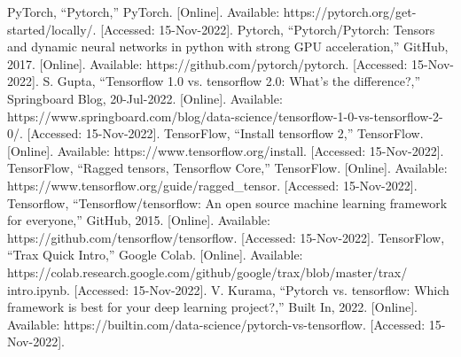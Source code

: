 \documentclass[conference]{IEEEtran}
\begin{document}
\begin{thebibliography}{00}
PyTorch, “Pytorch,” PyTorch. [Online]. Available: https://pytorch.org/get-started/locally/. [Accessed: 15-Nov-2022]. 
Pytorch, “Pytorch/Pytorch: Tensors and dynamic neural networks in python with strong GPU acceleration,” GitHub, 2017. [Online]. Available: https://github.com/pytorch/pytorch. [Accessed: 15-Nov-2022]. 
S. Gupta, “Tensorflow 1.0 vs. tensorflow 2.0: What's the difference?,” Springboard Blog, 20-Jul-2022. [Online]. Available: https://www.springboard.com/blog/data-science/tensorflow-1-0-vs-tensorflow-2-0/. [Accessed: 15-Nov-2022]. 
TensorFlow, “Install tensorflow 2,” TensorFlow. [Online]. Available: https://www.tensorflow.org/install. [Accessed: 15-Nov-2022]. 
TensorFlow, “Ragged tensors, Tensorflow Core,” TensorFlow. [Online]. Available: https://www.tensorflow.org/guide/ragged\_tensor. [Accessed: 15-Nov-2022]. 
Tensorflow, “Tensorflow/tensorflow: An open source machine learning framework for everyone,” GitHub, 2015. [Online]. Available: https://github.com/tensorflow/tensorflow. [Accessed: 15-Nov-2022]. 
TensorFlow, “Trax Quick Intro,” Google Colab. [Online]. Available: https://colab.research.google.com/github/google/trax/blob/master/trax/ intro.ipynb. [Accessed: 15-Nov-2022]. 
V. Kurama, “Pytorch vs. tensorflow: Which framework is best for your deep learning project?,” Built In, 2022. [Online]. Available: https://builtin.com/data-science/pytorch-vs-tensorflow. [Accessed: 15-Nov-2022]. 

\end{thebibliography}
\vspace{12pt}
\end{document}
